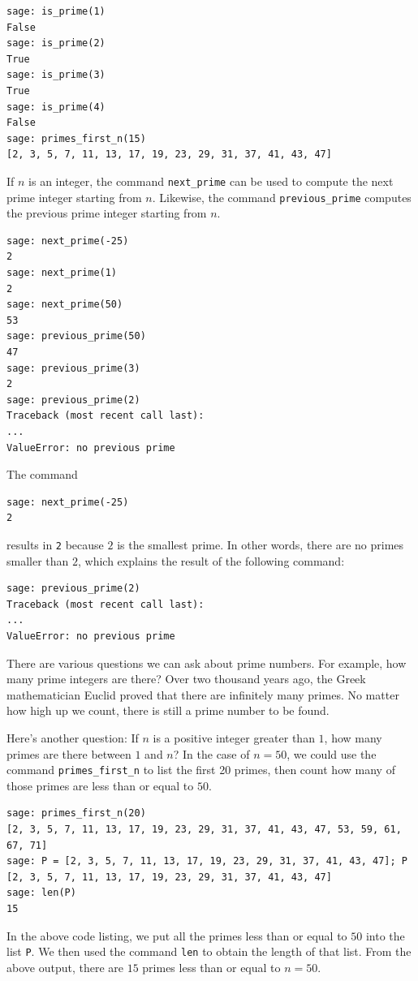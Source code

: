 \begin{lstlisting}
sage: is_prime(1)
False
sage: is_prime(2)
True
sage: is_prime(3)
True
sage: is_prime(4)
False
sage: primes_first_n(15)
[2, 3, 5, 7, 11, 13, 17, 19, 23, 29, 31, 37, 41, 43, 47]
\end{lstlisting}

If $n$ is an integer, the command \verb!next_prime! can be used to
compute the next prime integer starting from $n$. Likewise, the command
\verb!previous_prime! computes the previous prime integer starting
from $n$.
%
\begin{lstlisting}
sage: next_prime(-25)
2
sage: next_prime(1)
2
sage: next_prime(50)
53
sage: previous_prime(50)
47
sage: previous_prime(3)
2
sage: previous_prime(2)
Traceback (most recent call last):
...
ValueError: no previous prime
\end{lstlisting}
%
The command
%
\begin{lstlisting}
sage: next_prime(-25)
2
\end{lstlisting}
%
results in \verb!2! because $2$ is the smallest prime. In other words,
there are no primes smaller than $2$, which explains the result of the
following command:
%
\begin{lstlisting}
sage: previous_prime(2)
Traceback (most recent call last):
...
ValueError: no previous prime
\end{lstlisting}

There are various questions we can ask about prime numbers. For
example, how many prime integers are there? Over two thousand years
ago, the Greek mathematician Euclid proved that there are infinitely
many primes. No matter how high up we count, there is still a prime
number to be found.

Here's another question: If $n$ is a positive integer greater than
$1$, how many primes are there between $1$ and $n$? In the case of $n
= 50$, we could use the command \verb!primes_first_n! to list the
first 20 primes, then count how many of those primes are less than or
equal to $50$.
%
\begin{lstlisting}
sage: primes_first_n(20)
[2, 3, 5, 7, 11, 13, 17, 19, 23, 29, 31, 37, 41, 43, 47, 53, 59, 61, 67, 71]
sage: P = [2, 3, 5, 7, 11, 13, 17, 19, 23, 29, 31, 37, 41, 43, 47]; P
[2, 3, 5, 7, 11, 13, 17, 19, 23, 29, 31, 37, 41, 43, 47]
sage: len(P)
15
\end{lstlisting}
%
In the above code listing, we put all the primes less than or equal to
$50$ into the list \verb!P!. We then used the command \verb!len! to
obtain the length of that list. From the above output, there are $15$
primes less than or equal to $n = 50$.

